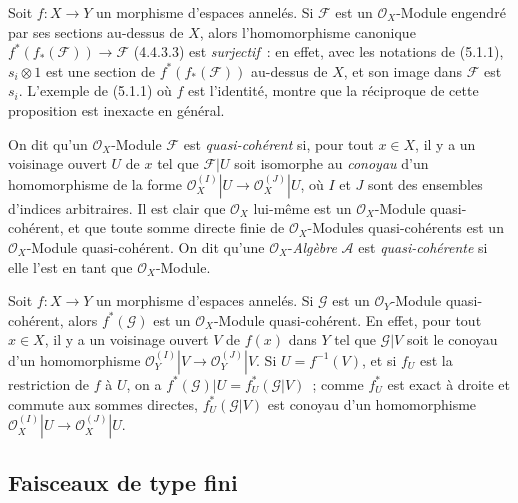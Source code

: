 \begin{env}[5.1.2]
\label{0.5.1.2-fr}
Soit $f:X\to Y$ un morphisme d'espaces annelés. Si $\mathcal{F}$ est un
$\mathcal{O}_X$-Module engendré par ses sections au-dessus de $X$, alors
l'homomorphisme canonique
$f^*(f_*(\mathcal{F}))\to\mathcal{F}$ (4.4.3.3) est \emph{surjectif}~: en
effet, avec les notations de (5.1.1), $s_i\otimes1$ est une section de
$f^*(f_*(\mathcal{F}))$ au-dessus de $X$, et son image dans $\mathcal{F}$ est
$s_i$. L'exemple de (5.1.1) où $f$ est l'identité, montre que la réciproque de
cette proposition est inexacte en général.
\end{env}

\begin{env}[5.1.3]
\label{0.5.1.3-fr}
On dit qu'un $\mathcal{O}_X$-Module $\mathcal{F}$ est \emph{quasi-cohérent}
si, pour tout $x\in X$, il y a un voisinage ouvert $U$ de $x$ tel que
$\mathcal{F}|U$ soit isomorphe au \emph{conoyau} d'un homomorphisme de la
forme
$\mathcal{O}_X^{(I)}|U\to\mathcal{O}_X^{(J)}|U$, où $I$ et $J$ sont des
ensembles d'indices arbitraires. Il est clair que $\mathcal{O}_X$ lui-même est
un $\mathcal{O}_X$-Module quasi-cohérent, et que toute somme directe finie de
$\mathcal{O}_X$-Modules quasi-cohérents est un $\mathcal{O}_X$-Module
quasi-cohérent. On dit qu'une $\mathcal{O}_X$-\emph{Algèbre} $\mathcal{A}$ est
\emph{quasi-cohérente} si elle l'est en tant que $\mathcal{O}_X$-Module.
\end{env}

\begin{env}[5.1.4]
\label{0.5.1.4-fr}
Soit $f:X\to Y$ un morphisme d'espaces annelés. Si $\mathcal{G}$ est un
$\mathcal{O}_Y$-Module quasi-cohérent, alors $f^*(\mathcal{G})$ est un
$\mathcal{O}_X$-Module quasi-cohérent. En effet, pour tout $x\in X$, il y a
un voisinage ouvert $V$ de $f(x)$ dans $Y$ tel que $\mathcal{G}|V$ soit le
conoyau d'un homomorphisme
$\mathcal{O}_Y^{(I)}|V\to\mathcal{O}_Y^{(J)}|V$. Si $U=f^{-1}(V)$, et si
$f_U$ est la restriction de $f$ à $U$, on a
$f^*(\mathcal{G})|U=f_U^*(\mathcal{G}|V)$~; comme $f_U^*$ est exact à droite
et commute aux sommes directes, $f_U^*(\mathcal{G}|V)$ est conoyau d'un
homomorphisme
$\mathcal{O}_X^{(I)}|U\to\mathcal{O}_X^{(J)}|U$.
\end{env}

\subsection{Faisceaux de type fini}
\label{subsection:0.5.2-fr}


